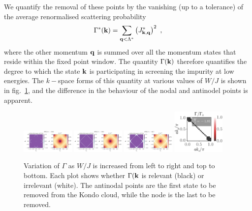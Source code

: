 \documentclass[reprint,hidelinks]{revtex4-2}
\begin{document}
We quantify the removal of these points by the vanishing (up to a tolerance) of the average renormalised scattering probability 
\begin{equation}\begin{aligned}
	\Gamma^*({\bf k}) = \sum_{{\bf q} < \Lambda^*} \left(J^*_{{\bf k}, {\bf q}}\right)^2~,
\end{aligned}\end{equation}
where the other momentum \({\bf q}\) is summed over all the momentum states that reside within the fixed point window. The quantity \(\Gamma({\bf k})\) therefore quantifies the degree to which the state \({\bf k}\) is participating in screening the impurity at low energies. The \(k-\)space forms of this quantity at various values of \(W/J\) is shown in fig.~\ref{gamma_kxky}, and the difference in the behaviour of the nodal and antinodel points is apparent. 

\begin{figure}[!htpb]
	\centering
	\includegraphics[width=0.23\textwidth]{scattProb-3.pdf}
	\includegraphics[width=0.23\textwidth]{scattProb-5.pdf}
	\includegraphics[width=0.23\textwidth]{scattProb-6.pdf}
	\includegraphics[width=0.23\textwidth]{scattProb-7.pdf}
	\caption{Variation of \(\Gamma\) as \(W/J\) is increased from left to right and top to bottom. Each plot shows whether \(\Gamma({\bf k}\) is relevant (black) or irrelevant (white). The antinodal points are the first state to be removed from the Kondo cloud, while the node is the last to be removed.}
	\label{gamma_kxky}
\end{figure}
\end{document}
